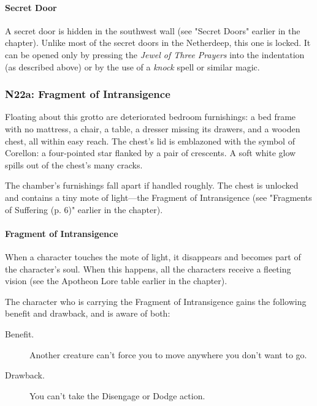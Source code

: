 \documentclass[letterpaper, 11pt, bg=full, twocolumn]{dndbook}
\begin{document}
\paragraph{Secret Door}

A secret door is hidden in the southwest wall (see "Secret Doors" earlier in the chapter). Unlike most of the secret doors in the Netherdeep, this one is locked. It can be opened only by pressing the \textit{Jewel of Three Prayers} into the indentation (as described above) or by the use of a \textit{knock} spell or similar magic.

\subsubsection{N22a: Fragment of Intransigence}

\begin{DndReadAloud}
Floating about this grotto are deteriorated bedroom furnishings: a bed frame with no mattress, a chair, a table, a dresser missing its drawers, and a wooden chest, all within easy reach. The chest's lid is emblazoned with the symbol of Corellon: a four-pointed star flanked by a pair of crescents. A soft white glow spills out of the chest's many cracks.
\end{DndReadAloud}

The chamber's furnishings fall apart if handled roughly. The chest is unlocked and contains a tiny mote of light---the Fragment of Intransigence (see "Fragments of Suffering (p. 6)" earlier in the chapter).

\paragraph{Fragment of Intransigence}

When a character touches the mote of light, it disappears and becomes part of the character's soul. When this happens, all the characters receive a fleeting vision (see the Apotheon Lore table earlier in the chapter).

The character who is carrying the Fragment of Intransigence gains the following benefit and drawback, and is aware of both:

\begin{DndSidebar}{}
\begin{description}
\item[Benefit.] Another creature can't force you to move anywhere you don't want to go.
\item[Drawback.] You can't take the Disengage or Dodge action.
\end{description}
\end{DndSidebar}
\end{document}
